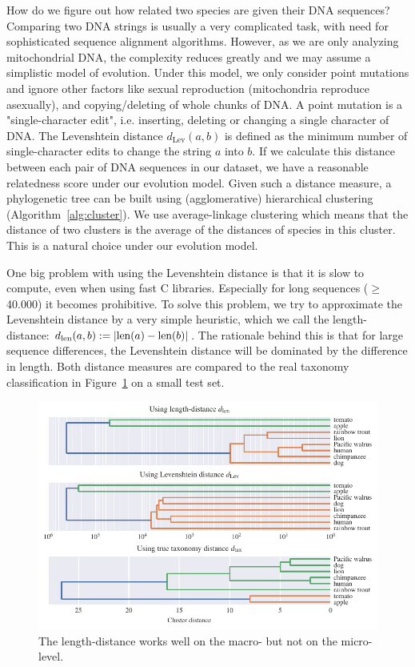 \documentclass{article}
\begin{document}
How do we figure out how related two species are given their DNA sequences? Comparing two DNA strings is usually a very complicated task, with need for sophisticated sequence alignment algorithms. However, as we are only analyzing mitochondrial DNA, the complexity reduces greatly and we may assume a simplistic model of evolution. Under this model, we only consider point mutations and ignore other factors like sexual reproduction (mitochondria reproduce asexually), and copying/deleting of whole chunks of DNA. A point mutation is a "single-character edit", i.e. inserting, deleting or changing a single character of DNA. The Levenshtein distance $d_\mathrm{Lev}(a, b)$ is defined as the minimum number of single-character edits to change the string $a$ into $b$. If we calculate this distance between each pair of DNA sequences in our dataset, we have a reasonable relatedness score under our evolution model. Given such a distance measure, a phylogenetic tree can be built using (agglomerative) hierarchical clustering (Algorithm~\ref{alg:cluster}). We use average-linkage clustering which means that the distance of two clusters is the average of the distances of species in this cluster. This is a natural choice under our evolution model.

One big problem with using the Levenshtein distance is that it is slow to compute, even when using fast C libraries. Especially for long sequences ($\geq$ 40.000) it becomes prohibitive. To solve this problem, we try to approximate the Levenshtein distance by a very simple heuristic, which we call the length-distance: $d_\mathrm{len}(a, b) := \abs{\mathrm{len}(a) - \mathrm{len}(b)}$. The rationale behind this is that for large sequence differences, the Levenshtein distance will be dominated by the difference in length. Both distance measures are compared to the real taxonomy classification in Figure~\ref{fig:dendro_test} on a small test set.

\begin{figure}[htbp]
    \centering
    \includegraphics{dendo_test.pdf}
    \caption{The length-distance works well on the macro- but not on the micro-level.}
    \label{fig:dendro_test}
\end{figure}
\end{document}
